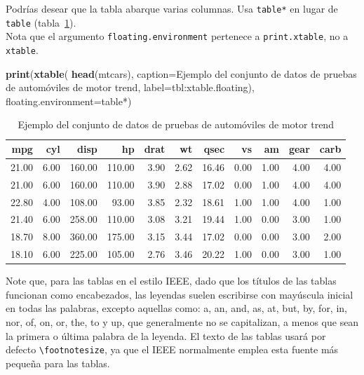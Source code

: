 \documentclass[a4paper,conference]{IEEEtran}
\newenvironment{Shaded}{\begin{snugshade}}{\end{snugshade}}
\newcommand{\AttributeTok}[1]{\textcolor[rgb]{0.13,0.29,0.53}{#1}}
\newcommand{\FunctionTok}[1]{\textcolor[rgb]{0.13,0.29,0.53}{\textbf{#1}}}
\newcommand{\NormalTok}[1]{#1}
\newcommand{\StringTok}[1]{\textcolor[rgb]{0.31,0.60,0.02}{#1}}
\begin{document}
Podrías desear que la tabla abarque varias columnas. Usa \texttt{table*}
en lugar de \texttt{table} (tabla~\ref{tbl:xtable.floating}).\\
Nota que el argumento \texttt{floating.environment} pertenece a
\texttt{print.xtable}, no a \texttt{xtable}.

\begin{Shaded}
\begin{Highlighting}[]
\FunctionTok{print}\NormalTok{(}\FunctionTok{xtable}\NormalTok{(}
    \FunctionTok{head}\NormalTok{(mtcars),}
    \AttributeTok{caption=}\StringTok{\textquotesingle{}Ejemplo del conjunto de datos}
\StringTok{             de pruebas de automóviles de motor trend\textquotesingle{}}\NormalTok{,}
    \AttributeTok{label=}\StringTok{\textquotesingle{}tbl:xtable.floating\textquotesingle{}}\NormalTok{),}
  \AttributeTok{floating.environment=}\StringTok{\textquotesingle{}table*\textquotesingle{}}\NormalTok{)}
\end{Highlighting}
\end{Shaded}

\begin{table}[!t]
\centering
\caption{Ejemplo del conjunto de datos
             de pruebas de automóviles de motor trend} 
\label{tbl:xtable.floating}
\begin{tabular}{rrrrrrrrrrr}
  \hline
mpg & cyl & disp & hp & drat & wt & qsec & vs & am & gear & carb \\ 
  \hline
21.00 & 6.00 & 160.00 & 110.00 & 3.90 & 2.62 & 16.46 & 0.00 & 1.00 & 4.00 & 4.00 \\ 
  21.00 & 6.00 & 160.00 & 110.00 & 3.90 & 2.88 & 17.02 & 0.00 & 1.00 & 4.00 & 4.00 \\ 
  22.80 & 4.00 & 108.00 & 93.00 & 3.85 & 2.32 & 18.61 & 1.00 & 1.00 & 4.00 & 1.00 \\ 
  21.40 & 6.00 & 258.00 & 110.00 & 3.08 & 3.21 & 19.44 & 1.00 & 0.00 & 3.00 & 1.00 \\ 
  18.70 & 8.00 & 360.00 & 175.00 & 3.15 & 3.44 & 17.02 & 0.00 & 0.00 & 3.00 & 2.00 \\ 
  18.10 & 6.00 & 225.00 & 105.00 & 2.76 & 3.46 & 20.22 & 1.00 & 0.00 & 3.00 & 1.00 \\ 
   \hline
\end{tabular}
\end{table}

Note que, para las tablas en el estilo IEEE, dado que los títulos de las
tablas funcionan como encabezados, las leyendas suelen escribirse con
mayúscula inicial en todas las palabras, excepto aquellas como: a, an,
and, as, at, but, by, for, in, nor, of, on, or, the, to y up, que
generalmente no se capitalizan, a menos que sean la primera o última
palabra de la leyenda. El texto de las tablas usará por defecto
\texttt{\textbackslash{}footnotesize}, ya que el IEEE normalmente emplea
esta fuente más pequeña para las tablas.
\end{document}
